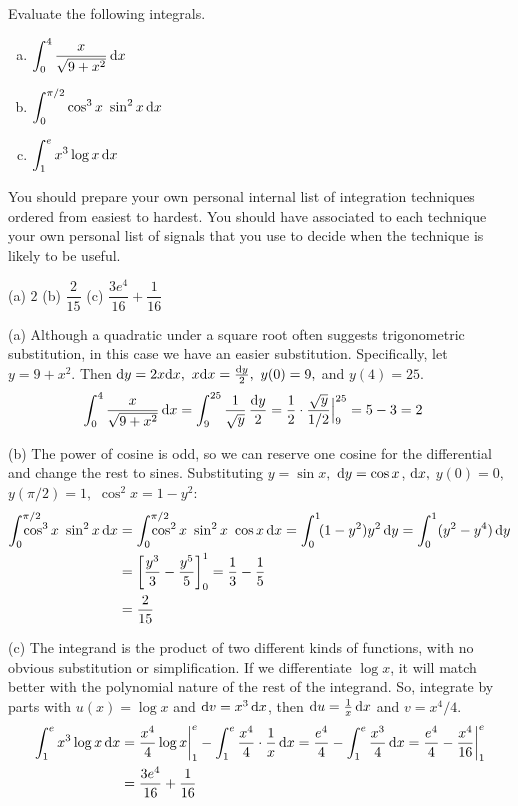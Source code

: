 \begin{question}[1997A]
Evaluate the following integrals.
\begin{enumerate}[(a)]
\item
$\displaystyle\int_0^4\frac{x}{\sqrt{9+x^2}}\,\mathrm{d}x$
 \item
$\displaystyle\int_0^{\pi/2}\cos^3x\ \sin^2x\,\dee{x}$
\item
 $\displaystyle\int_1^{e}x^3\log x\,\mathrm{d}x$
\end{enumerate}
\end{question}

\begin{hint}
You should prepare your own personal internal list of integration techniques ordered
from easiest to hardest. You should have associated to each technique
your own personal list of signals that you use to decide when the technique
is likely to be useful.
\end{hint}

\begin{answer} (a)
$2$
\qquad (b)
$\dfrac{2}{15}$
\qquad (c)
$\dfrac{3e^4}{16}+\dfrac{1}{16}$
\end{answer}

\begin{solution} (a)  Although a quadratic under a square root often suggests trigonometric substitution, in this case we have an easier substitution.
Specifically, let $y=9+x^2$. Then $\dee{y}=2x\dee{x},\ x\dee{x}=\frac{\dee{y}}{2},\ y(0)=9,$ and $y(4)=25$.
\begin{align*}
\int_0^4\frac{x}{\sqrt{9+x^2}}\,\mathrm{d}x
&=\int_9^{25}\frac{1}{\sqrt{y}}\,\frac{\mathrm{d}y}{2}
=\frac{1}{2}\cdot\frac{\sqrt{y}}{1/2}\Big|_9^{25}
=5-3= 2
\end{align*}

\noindent (b)
The power of cosine is odd, so we can reserve one cosine for the differential and change the rest to sines.
 Substituting $y=\sin x,$ $\mathrm{d}y=\cos x$, $\mathrm{d}x,$ $y(0)=0,$  $y(\pi/2)=1,$ $ \cos^2x=1-y^2$:
\begin{align*}
\int_0^{\pi/2}\hskip-.2in\cos^3x\ \sin^2x\,\dee{x}
&=\int_0^{\pi/2}\hskip-.2in\cos^2x\ \sin^2x\ \cos x\,\dee{x}
=\int_0^1\!(1-y^2)y^2\,\dee{y}
=\int_0^1(y^2-y^4)\,\dee{y} \\
&=\bigg[\frac{y^3}{3}-\frac{y^5}{5}\bigg]_0^1
=\frac{1}{3}-\frac{1}{5} \\
&= \frac{2}{15}
\end{align*}

\noindent (c)
The integrand is the product of two different kinds of functions, with no obvious substitution or simplification. If we differentiate $\log x$, it will match better with the polynomial nature of the rest of the integrand.
So, integrate by parts with $u(x)=\log x$ and $\mathrm{d}v=x^3\,\mathrm{d}x$, then
$\mathrm{d}u=\frac{1}{x}\,\mathrm{d}x$ and $v=x^4/4$.
\begin{align*}
\int_1^{e}x^3\log x\,\mathrm{d}x
&=\frac{x^4}{4}\log x\bigg|_1^e
-\int_1^{e}\frac{x^4}{4}\cdot\frac{1}{x}\,\mathrm{d}x
=\frac{e^4}{4}-\int_1^{e}\frac{x^3}{4}\,\mathrm{d}x
=\frac{e^4}{4}-\frac{x^4}{16}\bigg|_1^e \\
&=\frac{3e^4}{16}+\frac{1}{16}
\end{align*}
\end{solution}

